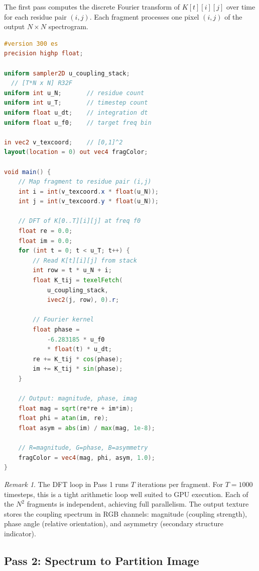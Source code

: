 \documentclass[11pt,twocolumn,a4paper]{article}
\theoremstyle{definition}
\theoremstyle{remark}
\newtheorem{remark}[theorem]{Remark}
\begin{document}
The first pass computes the discrete Fourier transform of $K[t][i][j]$ over time for each residue pair $(i, j)$. Each fragment processes one pixel $(i, j)$ of the output $N \times N$ spectrogram.

\begin{lstlisting}[language=GLSL,caption={Pass 1: Coupling Spectrogram (DFT per fragment)},label=lst:pass1]
#version 300 es
precision highp float;

uniform sampler2D u_coupling_stack;
  // [T*N x N] R32F
uniform int u_N;       // residue count
uniform int u_T;       // timestep count
uniform float u_dt;    // integration dt
uniform float u_f0;    // target freq bin

in vec2 v_texcoord;    // [0,1]^2
layout(location = 0) out vec4 fragColor;

void main() {
    // Map fragment to residue pair (i,j)
    int i = int(v_texcoord.x * float(u_N));
    int j = int(v_texcoord.y * float(u_N));

    // DFT of K[0..T][i][j] at freq f0
    float re = 0.0;
    float im = 0.0;
    for (int t = 0; t < u_T; t++) {
        // Read K[t][i][j] from stack
        int row = t * u_N + i;
        float K_tij = texelFetch(
            u_coupling_stack,
            ivec2(j, row), 0).r;

        // Fourier kernel
        float phase =
            -6.283185 * u_f0
            * float(t) * u_dt;
        re += K_tij * cos(phase);
        im += K_tij * sin(phase);
    }

    // Output: magnitude, phase, imag
    float mag = sqrt(re*re + im*im);
    float phi = atan(im, re);
    float asym = abs(im) / max(mag, 1e-8);

    // R=magnitude, G=phase, B=asymmetry
    fragColor = vec4(mag, phi, asym, 1.0);
}
\end{lstlisting}

\begin{remark}
The DFT loop in Pass 1 runs $T$ iterations per fragment. For $T = 1000$ timesteps, this is a tight arithmetic loop well suited to GPU execution. Each of the $N^2$ fragments is independent, achieving full parallelism. The output texture stores the coupling spectrum in RGB channels: magnitude (coupling strength), phase angle (relative orientation), and asymmetry (secondary structure indicator).
\end{remark}

\subsection{Pass 2: Spectrum to Partition Image}
\end{document}
